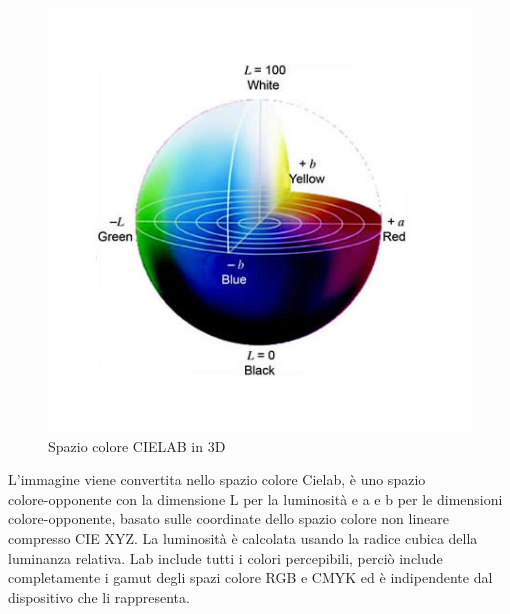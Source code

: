 \documentclass[a4paper,12pt]{report}
\begin{document}
\begin{figure}
\begin{minipage}{0.35\textwidth}
          \includegraphics[width=\textwidth]{assets/images/cielab1.jpg}   
          \caption{Spazio colore CIELAB in 3D}
        \end{minipage}
      \end{figure}

      L'immagine viene convertita nello spazio colore Cielab, è uno spazio \\
      colore-opponente con la dimensione L per la luminosità e a e b per le dimensioni colore-opponente,
      basato sulle coordinate dello spazio colore non lineare compresso CIE XYZ.
      La luminosità è calcolata usando la radice cubica della luminanza relativa. 
      Lab include tutti i colori percepibili, perciò include completamente i gamut degli 
      spazi colore RGB e CMYK ed è indipendente dal dispositivo che li rappresenta.
      
\end{document}
